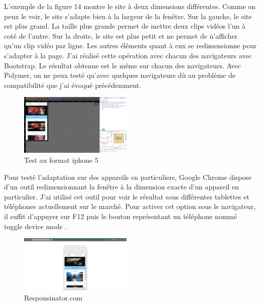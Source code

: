 \documentclass{article}
\begin{document}
L'exemple de la figure 14 montre le site \`a deux dimensions diff\'erentes. Comme on peux le voir, le site s'adapte bien \`a la largeur de la fen\^etre. Sur la gauche, le site est plus grand. La taille plus grande permet de mettre deux clips vid\'eos l'un \`a cot\'e de l'autre. Sur la droite, le site est plus petit et ne permet de n'afficher qu'un clip vid\'eo par ligne. Les autres \'el\'ements quant \`a eux se redimensionne pour s'adapter \`a la page. J'ai r\'ealis\'e cette op\'eration avec chacun des navigateurs avec Bootstrap. Le r\'esultat obtenue est le m\^eme sur chacun des navigateurs. Avec Polymer, on ne peux test\'e qu'avec quelques navigateurs d\`u au probl\`eme de compatibilit\'e que j'ai \'evoqu\'e pr\'ec\'edemment.\\

\begin{figure}
  \vspace{-25pt}
  \begin{center}
    \includegraphics[width=0.48\textwidth]{p16}
  \end{center}
  \vspace{-20pt}
  \caption{Test au format iphone 5}
  \vspace{-10pt}
\end{figure}

Pour test\'e l'adaptation sur des appareils en particuliers, Google Chrome dispose d'un outil redimensionnant la fen\^etre \`a la dimension exacte d'un appareil en particulier. J'ai utilis\'e cet outil pour voir le r\'esultat sous diff\'erentes tablettes et t\'el\'ephones actuellement sur le march\'e. Pour activer cet option sous le navigateur, il suffit d'appuyer sur F12 puis le bouton repr\'esentant un t\'el\'ephone nomm\'e \og toggle device mode \fg{}.
\vspace{0.5cm}\\
\begin{figure}
  \vspace{-25pt}
  \begin{center}
    \includegraphics[width=0.48\textwidth]{p17}
  \end{center}
  \vspace{-20pt}
  \caption{Responsinator.com}
  \vspace{-10pt}
\end{figure} 
\end{document}

